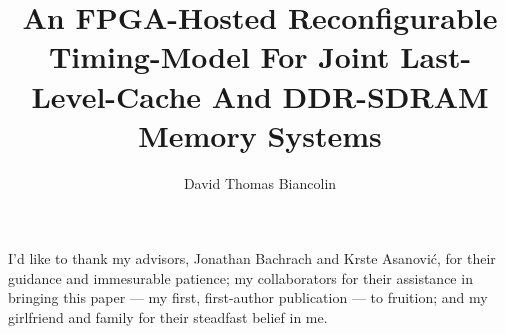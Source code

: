 \documentclass[masters]{ucbthesis}
\begin{document}

\title{An FPGA-Hosted Reconfigurable Timing-Model For Joint Last-Level-Cache And DDR-SDRAM Memory Systems}
\author{David Thomas Biancolin}


\clearpage

\maketitle

%

\begin{frontmatter}


\setcounter{tocdepth}{2}
\setcounter{secnumdepth}{2}
\tableofcontents
\clearpage
\listoffigures
\clearpage
\listoftables

    \begin{acknowledgements}

I'd like to thank my advisors, Jonathan Bachrach and Krste Asanovi\'c, for
their guidance and immesurable patience; my collaborators for their assistance in
bringing this paper --- my first, first-author publication --- to
fruition; and my girlfriend and family for their steadfast belief in me.

    \end{acknowledgements}
\end{frontmatter}
\end{document}
